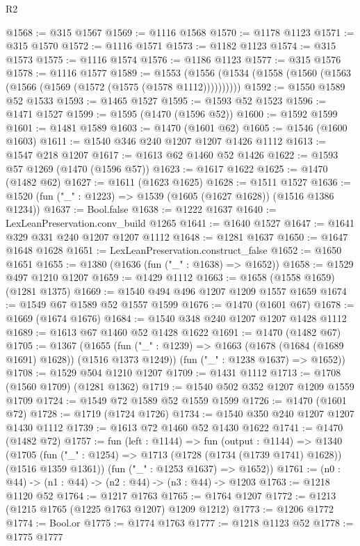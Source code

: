 \begin{lexlean}{R2}
\begin{coremodule}
@1568 := @315 @1567
@1569 := @1116 @1568
@1570 := @1178 @1123
@1571 := @315 @1570
@1572 := @1116 @1571
@1573 := @1182 @1123
@1574 := @315 @1573
@1575 := @1116 @1574
@1576 := @1186 @1123
@1577 := @315 @1576
@1578 := @1116 @1577
@1589 := @1553 (@1556 (@1534 (@1558 (@1560 (@1563 (@1566 (@1569 (@1572 (@1575 (@1578 @1112))))))))))
@1592 := @1550 @1589 @52 @1533
@1593 := @1465 @1527
@1595 := @1593 @52 @1523
@1596 := @1471 @1527
@1599 := @1595 (@1470 (@1596 @52))
@1600 := @1592 @1599
@1601 := @1481 @1589
@1603 := @1470 (@1601 @62)
@1605 := @1546 (@1600 @1603)
@1611 := @1540 @346 @240 @1207 @1207 @1426 @1112
@1613 := @1547 @218 @1207
@1617 := @1613 @62 @1460 @52 @1426
@1622 := @1593 @57 @1269 (@1470 (@1596 @57))
@1623 := @1617 @1622
@1625 := @1470 (@1482 @62)
@1627 := @1611 (@1623 @1625)
@1628 := @1511 @1527
@1636 := @1520 (fun ("_" : @1223) => @1539 (@1605 (@1627 @1628)) (@1516 @1386 @1234))
@1637 := Bool.false
@1638 := @1222 @1637
@1640 := LexLeanPreservation.conv_build @1265
@1641 := @1640 @1527
@1647 := @1641 @329 @331 @240 @1207 @1207 @1112
@1648 := @1281 @1637
@1650 := @1647 @1648 @1628
@1651 := LexLeanPreservation.construct_false
@1652 := @1650 @1651
@1655 := @1380 (@1636 (fun ("_" : @1638) => @1652))
@1658 := @1529 @497 @1210 @1207
@1659 := @1429 @1112
@1663 := @1658 (@1558 @1659) (@1281 @1375)
@1669 := @1540 @494 @496 @1207 @1209 @1557 @1659
@1674 := @1549 @67 @1589 @52 @1557 @1599
@1676 := @1470 (@1601 @67)
@1678 := @1669 (@1674 @1676)
@1684 := @1540 @348 @240 @1207 @1207 @1428 @1112
@1689 := @1613 @67 @1460 @52 @1428 @1622
@1691 := @1470 (@1482 @67)
@1705 := @1367
    (@1655
      (fun ("_" : @1239) => @1663 (@1678 (@1684 (@1689 @1691) @1628)) (@1516 @1373 @1249))
      (fun ("_" : @1238 @1637) => @1652))
@1708 := @1529 @504 @1210 @1207
@1709 := @1431 @1112
@1713 := @1708 (@1560 @1709) (@1281 @1362)
@1719 := @1540 @502 @352 @1207 @1209 @1559 @1709
@1724 := @1549 @72 @1589 @52 @1559 @1599
@1726 := @1470 (@1601 @72)
@1728 := @1719 (@1724 @1726)
@1734 := @1540 @350 @240 @1207 @1207 @1430 @1112
@1739 := @1613 @72 @1460 @52 @1430 @1622
@1741 := @1470 (@1482 @72)
@1757 := fun (left : @1144) =>
  fun (output : @1144) =>
  @1340
    (@1705
      (fun ("_" : @1254) => @1713 (@1728 (@1734 (@1739 @1741) @1628)) (@1516 @1359 @1361))
      (fun ("_" : @1253 @1637) => @1652))
@1761 := (n0 : @44) -> (n1 : @44) -> (n2 : @44) -> (n3 : @44) -> @1203
@1763 := @1218 @1120 @52
@1764 := @1217 @1763
@1765 := @1764 @1207
@1772 := @1213 (@1215 @1765 (@1225 @1763 @1207) @1209 @1212)
@1773 := @1206 @1772
@1774 := Bool.or
@1775 := @1774 @1763
@1777 := @1218 @1123 @52
@1778 := @1775 @1777

\end{coremodule}
\end{lexlean}
